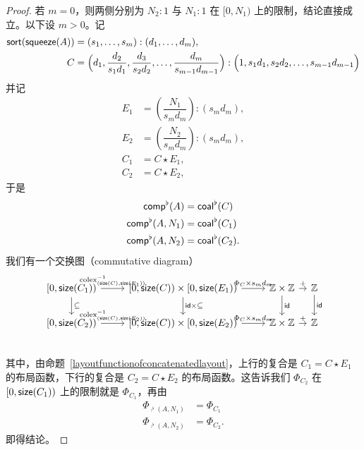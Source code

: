 \begin{proof}
    若 $m=0$，则两侧分别为 $N_2:1$ 与 $N_1:1$ 在 $[0,N_1)$ 上的限制，结论直接成立。以下设 $m>0$。记
    \begin{align*}
    \mathsf{sort}(\mathsf{squeeze}(A)) & = (s_1,\dots,s_m):(d_1,\dots,d_m), \\
    C & = \Bigl(d_1 , \dfrac{d_2}{s_1d_1} , \dfrac{d_3}{s_2d_2} , \dots ,\dfrac{d_m}{s_{m-1}d_{m-1}} \Bigr) : \Bigl(1 , s_1d_1 , s_2d_2, \dots ,s_{m-1}d_{m-1}\Bigr)
    \end{align*}
    并记
    \begin{align*}
    E_1 & = \left( \dfrac{N_1}{s_md_m}\right):(s_md_m), \\
    E_2 & = \left( \dfrac{N_2}{s_md_m}\right):(s_md_m), \\
    C_1 & = C \star E_1,\\
    C_2 & = C \star E_2,
    \end{align*}
    于是
    \begin{align*}
        \mathsf{comp}^\flat (A) & = \mathsf{coal}^\flat(C)\\
        \mathsf{comp}^\flat(A,N_1) & = \mathsf{coal}^\flat(C_1)\\
        \mathsf{comp}^\flat(A,N_2) & = \mathsf{coal}^\flat(C_2).
    \end{align*}
    我们有一个交换图（commutative diagram）
    \[\begin{tikzcd}[column sep=0.8em]  %
    {[}0,\size(C_1){)}\ar[rrr,"\text{colex}_{(\size(C),\size(E_1))}^{-1}"] \ar[d,"\subseteq"] & & & {[}0,\size(C){)} \times {[}0,\size(E_1) {)} \ar[rrr,"\Phi_C \times s_md_m "] \ar[d,"\id \times \subseteq"] & & & \mathbb{Z} \times \mathbb{Z} \ar[r,"+"] \ar[d,"\id" ] & \mathbb{Z} \ar[d,"\id"] \\
    {[}0,\size(C_2){)}\ar[rrr,"\text{colex}_{(\size(C),\size(E_2))}^{-1}"] & & & {[}0,\size(C){)} \times {[}0,\size(E_2) {)} \ar[rrr,"\Phi_C \times s_md_m "] & & & \mathbb{Z} \times \mathbb{Z} \ar[r,"+"] & \mathbb{Z} \\
    \end{tikzcd} \]
    其中，由命题~\ref{layoutfunctionofconcatenatedlayout}，上行的复合是 $C_1 = C \star E_1$ 的布局函数，下行的复合是 $C_2 = C \star E_2$ 的布局函数。这告诉我们 $\Phi_{C_2}$ 在 $[0,\mathsf{size}(C_1))$ 上的限制就是 $\Phi_{C_1}$，再由
    \begin{align*}
    \Phi_{\comp^\flat (A,N_1)}&  = \Phi_{C_1}\\
    \Phi_{\comp^\flat (A,N_2)}&  = \Phi_{C_2}.
    \end{align*}
    即得结论。
\end{proof}



